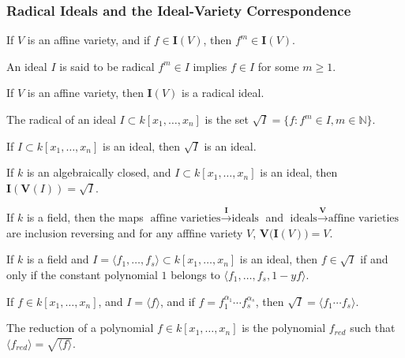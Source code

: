 \documentclass[crop=false,class=book,oneside]{standalone}
\begin{document}
\subsubsection{Radical Ideals and the Ideal-Variety Correspondence}
\begin{theorem}
If $V$ is an affine variety, and if $f\in \textbf{I}(V)$, then $f^m\in \textbf{I}(V)$.
\end{theorem}
\begin{definition}
An ideal $I$ is said to be radical $f^m \in I$ implies $f\in I$ for some $m\geq 1$.
\end{definition}
\begin{theorem}
If $V$ is an affine variety, then $\textbf{I}(V)$ is a radical ideal.
\end{theorem}
\begin{definition}
The radical of an ideal $I\subset k[x_{1},\hdots,x_{n}]$ is the set $\sqrt{I}=\{f:f^{m}\in I,m\in\mathbb{N}\}$.
\end{definition}
\begin{theorem}
If $I\subset k[x_1,\hdots ,x_n]$ is an ideal, then $\sqrt{I}$ is an ideal.
\end{theorem}
\begin{theorem}
If $k$ is an algebraically closed, and $I\subset k[x_1,\hdots ,x_n]$ is an ideal, then $\textbf{I}(\mathbf{V}(I))=\sqrt{I}$.
\end{theorem}
\begin{theorem}
If $k$ is a field, then the maps $\textrm{affine varieties} \overset{\textbf{I}}\rightarrow \textrm{ideals}$ and $\textrm{ideals} \overset{\mathbf{V}}\rightarrow \textrm{affine varieties}$ are inclusion reversing and for any afffine variety $V$, $\mathbf{V}\big(\textbf{I}(V)\big) = V$.
\end{theorem}
\begin{theorem}
If $k$ is a field and $I=\langle f_1,\hdots, f_s\rangle\subset k[x_1,\hdots ,x_n]$ is an ideal, then $f\in \sqrt{I}$ if and only if the constant polynomial $1$ belongs to $\langle f_1,\hdots, f_s, 1-yf\rangle$.
\end{theorem}
\begin{theorem}
If $f\in k[x_1,\hdots ,x_n]$, and $I = \langle f\rangle$, and if $f = f_1^{\alpha_1}\cdots f_s^{\alpha_s}$, then $\sqrt{I} = \langle f_1\cdots f_s\rangle$.
\end{theorem}
\begin{definition}
The reduction of a polynomial $f\in k[x_1,\hdots ,x_n]$ is the polynomial $f_{red}$ such that $\langle f_{red}\rangle = \sqrt{\langle f\rangle}$.
\end{definition}
\end{document}

